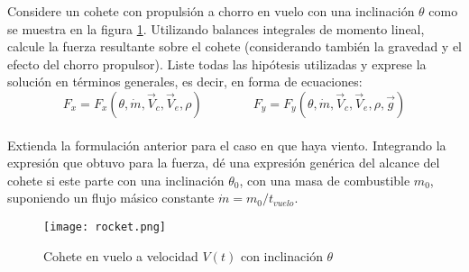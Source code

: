 \item Considere un cohete con propulsión a chorro en vuelo con una inclinación $\theta$
como se muestra en la figura \ref{fig:cohete}. Utilizando balances integrales
de momento lineal, calcule la fuerza resultante sobre el cohete (considerando
también la gravedad y el efecto del chorro propulsor). Liste todas las hipótesis
utilizadas y exprese la solución en términos generales, es decir, en forma
de ecuaciones:
\begin{equation*}
F_x = F_x(\theta, \dot{m}, \vec{V}_{c}, \vec{V}_{e}, \rho)
\qquad \qquad
F_y = F_y(\theta, \dot{m}, \vec{V}_{c}, \vec{V}_{e}, \rho, \vec{g})
\end{equation*}
\\
Extienda la formulación anterior para el caso en que haya viento. Integrando la expresión que obtuvo para la fuerza, dé una expresión genérica del alcance del cohete si este parte con una inclinación $\theta_0$, con una masa de combustible $m_0$, suponiendo un flujo másico constante $\dot{m} = m_0/t_{vuelo}$.
\begin{figure}[h!!!!]
  \centering
  \texttt{[image: rocket.png]}
  \caption{Cohete en vuelo a velocidad $V(t)$ con inclinación $\theta$}
  \label{fig:cohete}
\end{figure}
